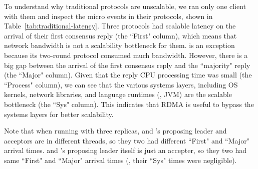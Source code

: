 To understand why traditional protocols are unscalable, we ran 
only one client with them and inspect the micro events in their protocols, 
shown in Table~\ref{tab:traditional-latency}. Three protocols had scalable 
latency on the arrival of their first consensus reply (the ``First" column), 
which means that network bandwidth is not a scalability bottleneck for them.  
\libpaxos is an exception because its two-round protocol consumed much 
bandwidth. However, there is a big gap between the arrival of the first 
consensus reply and the ``majority" reply (the ``Major" column). Given that the 
reply CPU processing time was small (the ``Process" column), we can see that 
the various systems layers, including OS kernels, network libraries, and 
language runtimes (\eg, JVM) are the scalable bottleneck (the ``Sys" column). 
This indicates that RDMA is useful to bypass the systems layers for better 
scalability.

Note that when running with three replicas, \libpaxos and \crane's proposing 
leader and acceptors are in different threads, so they two had different 
``First" and ``Major" arrival times. \crane and \spaxos's proposing 
leader itself is just an accepter, so they two had same ``First" and ``Major" 
arrival times (\ie, their ``Sys" times were negligible).


% 

